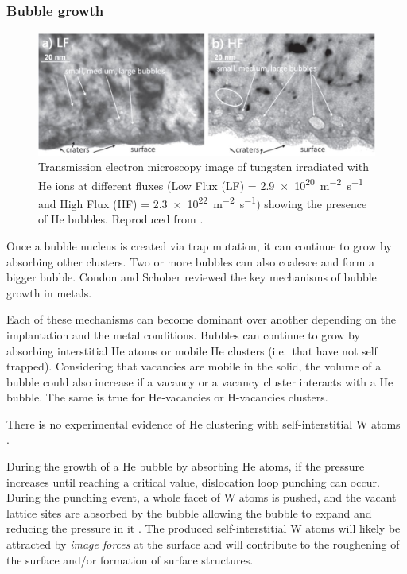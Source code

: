 \subsubsection{Bubble growth}

\begin{figure} [h!]
    \centering
    \includegraphics[width=\linewidth]{Figures/Chapter1/helium_bubbles_ialovega.jpg}
    \caption{Transmission electron microscopy image of tungsten irradiated with He ions at different fluxes (Low Flux (LF) = \SI{2.9e20}{m^{-2}.s^{-1}} and High Flux (HF) = \SI{2.3e22}{m^{-2}.s^{-1}}) showing the presence of He bubbles. Reproduced from \cite{ialovega_hydrogen_2020}.}
\end{figure}

Once a bubble nucleus is created via \gls{trap mutation}, it can continue to grow by absorbing other clusters.
Two or more bubbles can also coalesce and form a bigger bubble.
Condon and Schober  reviewed the key mechanisms of bubble growth in metals.

Each of these mechanisms can become dominant over another depending on the implantation and the metal conditions. 
Bubbles can continue to grow by absorbing interstitial \gls{He} atoms or mobile \gls{He} clusters (i.e.\ that have not self trapped).
Considering that vacancies are mobile in the solid, the volume of a bubble could also increase if a \gls{vacancy} or a \gls{vacancy} cluster interacts with a \gls{He} bubble.
The same is true for He-vacancies or H-vacancies clusters.

There is no experimental evidence of \gls{He} clustering with \gls{self-interstitial} \gls{W} atoms .

During the growth of a \gls{He} bubble by absorbing \gls{He} atoms, if the pressure increases until reaching a critical value, \gls{dislocation loop} punching can occur.
During the punching event, a whole facet of \gls{W} atoms is pushed, and the vacant \gls{lattice} sites are absorbed by the bubble allowing the bubble to expand and reducing the pressure in it .
The produced \gls{self-interstitial} \gls{W} atoms will likely be attracted by \textit{image forces} at the surface and will contribute to the roughening of the surface and/or formation of surface structures.

